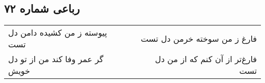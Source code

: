 \begin{center}
\section*{رباعی شماره ۷۲}
\label{sec:sh072}
\begin{longtable}{l p{0.5cm} r}
پیوسته ز من کشیده دامن دل تست
&&
فارغ ز من سوخته خرمن دل تست
\\
گر عمر وفا کند من از تو دل خویش
&&
فارغ‌تر از آن کنم که از من دل تست
\\
\end{longtable}
\end{center}
